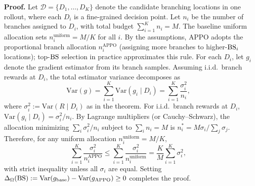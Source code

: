 \documentclass{llmxive}
\begin{document}
\textbf{Proof.}
Let $\mathcal{D}=\{D_1,\dots,D_K\}$ denote the candidate branching locations in one rollout, where each $D_i$ is a fine-grained decision point.
Let $n_i$ be the number of branches assigned to $D_i$, with total budget $\sum_{i=1}^K n_i = M$.
The baseline uniform allocation sets $n_i^{\mathrm{uniform}} = M/K$ for all $i$.
By the assumptions, APPO adopts the proportional branch allocation $n_i^{\mathrm{APPO}}$ (assigning more branches to higher-${\rm BS}_i$ locations); top-${\rm BS}$ selection in practice approximates this rule.
For each $D_i$, let $g_i$ denote the gradient estimator from its branch samples.
Assuming i.i.d.\ branch rewards at $D_i$, the total estimator variance decomposes as
\begin{equation}
\mathrm{Var}(g) = \sum_{i=1}^K \mathrm{Var}(g_i \mid D_i)
= \sum_{i=1}^K \frac{\sigma_i^2}{n_i},
\end{equation}
where $\sigma_i^2 := \mathrm{Var}(R \mid D_i)$ as in the theorem.  For i.i.d.\ branch rewards at $D_i$,
$\mathrm{Var}(g_i \mid D_i) = \sigma_i^2/n_i$.
By Lagrange multipliers (or Cauchy--Schwarz), the allocation minimizing
$\sum_i \sigma_i^2/n_i$ subject to $\sum_i n_i = M$ is
$n_i^* = M \sigma_i / \sum_j \sigma_j$.
Therefore, for any uniform allocation $n_i^{\mathrm{uniform}} = M/K$,
\[
\sum_{i=1}^K \frac{\sigma_i^2}{n_i^{\mathrm{APPO}}}
\le
\sum_{i=1}^K \frac{\sigma_i^2}{n_i^{\mathrm{uniform}}}
= \frac{K}{M}\sum_{i=1}^K \sigma_i^2,
\]
with strict inequality unless all $\sigma_i$ are equal.
Setting $\Delta_\Omega({\rm BS})
:= \mathrm{Var}(g_{\mathrm{base}}) - \mathrm{Var}(g_{\mathrm{APPO}}) \ge 0$
completes the proof.
\end{document}
